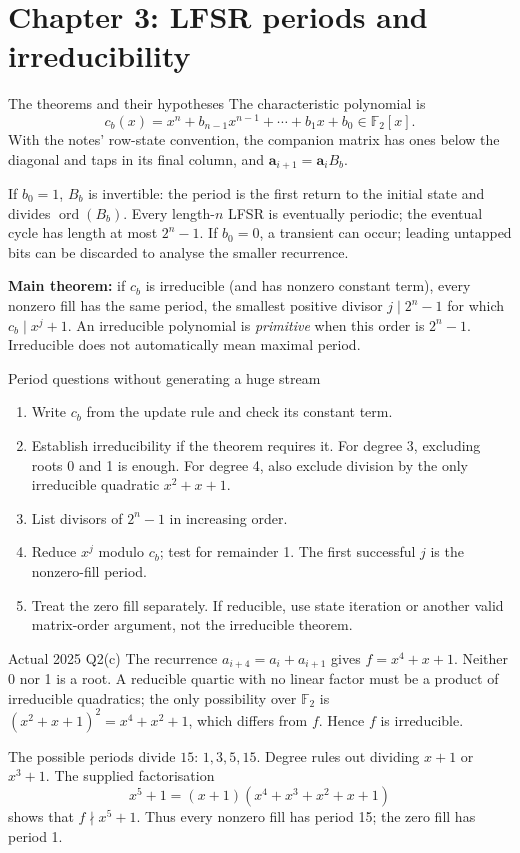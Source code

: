 \documentclass[11pt,a4paper]{article}
\newcommand{\F}{\mathbb F}\newcommand{\Z}{\mathbb Z}
\begin{document}
\section{Chapter 3: LFSR periods and irreducibility}
\begin{concept}{The theorems and their hypotheses}
The characteristic polynomial is
\[c_b(x)=x^n+b_{n-1}x^{n-1}+\cdots+b_1x+b_0\in\F_2[x].\]
With the notes' row-state convention, the companion matrix has ones below the diagonal and taps in its final column, and \(\mathbf a_{i+1}=\mathbf a_iB_b\).

If \(b_0=1\), \(B_b\) is invertible: the period is the first return to the initial state and divides \(\operatorname{ord}(B_b)\). Every length-\(n\) LFSR is eventually periodic; the eventual cycle has length at most \(2^n-1\). If \(b_0=0\), a transient can occur; leading untapped bits can be discarded to analyse the smaller recurrence.

\textbf{Main theorem:} if \(c_b\) is irreducible (and has nonzero constant term), every nonzero fill has the same period, the smallest positive divisor \(j\mid2^n-1\) for which \(c_b\mid x^j+1\). An irreducible polynomial is \emph{primitive} when this order is \(2^n-1\). Irreducible does not automatically mean maximal period.
\end{concept}
\begin{method}{Period questions without generating a huge stream}
\begin{enumerate}
\item Write \(c_b\) from the update rule and check its constant term.
\item Establish irreducibility if the theorem requires it. For degree 3, excluding roots 0 and 1 is enough. For degree 4, also exclude division by the only irreducible quadratic \(x^2+x+1\).
\item List divisors of \(2^n-1\) in increasing order.
\item Reduce \(x^j\) modulo \(c_b\); test for remainder 1. The first successful \(j\) is the nonzero-fill period.
\item Treat the zero fill separately. If reducible, use state iteration or another valid matrix-order argument, not the irreducible theorem.
\end{enumerate}
\end{method}
\begin{example}{Actual 2025 Q2(c)}
The recurrence \(a_{i+4}=a_i+a_{i+1}\) gives \(f=x^4+x+1\). Neither 0 nor 1 is a root. A reducible quartic with no linear factor must be a product of irreducible quadratics; the only possibility over \(\F_2\) is \((x^2+x+1)^2=x^4+x^2+1\), which differs from \(f\). Hence \(f\) is irreducible.

The possible periods divide \(15\): \(1,3,5,15\). Degree rules out dividing \(x+1\) or \(x^3+1\). The supplied factorisation
\[x^5+1=(x+1)(x^4+x^3+x^2+x+1)\]
shows that \(f\nmid x^5+1\). Thus every nonzero fill has period 15; the zero fill has period 1.
\end{example}
\end{document}
